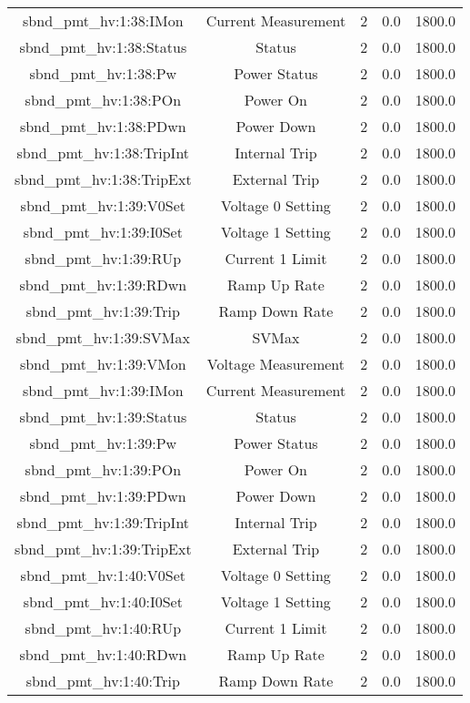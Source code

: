 \begin{table}[ptb]
\begin{tabular}{c | c c c c}
sbnd_pmt_hv:1:38:IMon & Current Measurement & 2 & 0.0 & 1800.0\\ 
sbnd_pmt_hv:1:38:Status & Status & 2 & 0.0 & 1800.0\\ 
sbnd_pmt_hv:1:38:Pw & Power Status & 2 & 0.0 & 1800.0\\ 
sbnd_pmt_hv:1:38:POn & Power On & 2 & 0.0 & 1800.0\\ 
sbnd_pmt_hv:1:38:PDwn & Power Down & 2 & 0.0 & 1800.0\\ 
sbnd_pmt_hv:1:38:TripInt & Internal Trip & 2 & 0.0 & 1800.0\\ 
sbnd_pmt_hv:1:38:TripExt & External Trip & 2 & 0.0 & 1800.0\\ 
sbnd_pmt_hv:1:39:V0Set & Voltage 0 Setting & 2 & 0.0 & 1800.0\\ 
sbnd_pmt_hv:1:39:I0Set & Voltage 1 Setting & 2 & 0.0 & 1800.0\\ 
sbnd_pmt_hv:1:39:RUp & Current 1 Limit & 2 & 0.0 & 1800.0\\ 
sbnd_pmt_hv:1:39:RDwn & Ramp Up Rate & 2 & 0.0 & 1800.0\\ 
sbnd_pmt_hv:1:39:Trip & Ramp Down Rate & 2 & 0.0 & 1800.0\\ 
sbnd_pmt_hv:1:39:SVMax & SVMax & 2 & 0.0 & 1800.0\\ 
sbnd_pmt_hv:1:39:VMon & Voltage Measurement & 2 & 0.0 & 1800.0\\ 
sbnd_pmt_hv:1:39:IMon & Current Measurement & 2 & 0.0 & 1800.0\\ 
sbnd_pmt_hv:1:39:Status & Status & 2 & 0.0 & 1800.0\\ 
sbnd_pmt_hv:1:39:Pw & Power Status & 2 & 0.0 & 1800.0\\ 
sbnd_pmt_hv:1:39:POn & Power On & 2 & 0.0 & 1800.0\\ 
sbnd_pmt_hv:1:39:PDwn & Power Down & 2 & 0.0 & 1800.0\\ 
sbnd_pmt_hv:1:39:TripInt & Internal Trip & 2 & 0.0 & 1800.0\\ 
sbnd_pmt_hv:1:39:TripExt & External Trip & 2 & 0.0 & 1800.0\\ 
sbnd_pmt_hv:1:40:V0Set & Voltage 0 Setting & 2 & 0.0 & 1800.0\\ 
sbnd_pmt_hv:1:40:I0Set & Voltage 1 Setting & 2 & 0.0 & 1800.0\\ 
sbnd_pmt_hv:1:40:RUp & Current 1 Limit & 2 & 0.0 & 1800.0\\ 
sbnd_pmt_hv:1:40:RDwn & Ramp Up Rate & 2 & 0.0 & 1800.0\\ 
sbnd_pmt_hv:1:40:Trip & Ramp Down Rate & 2 & 0.0 & 1800.0\\ 

\end{tabular}
\end{table}

